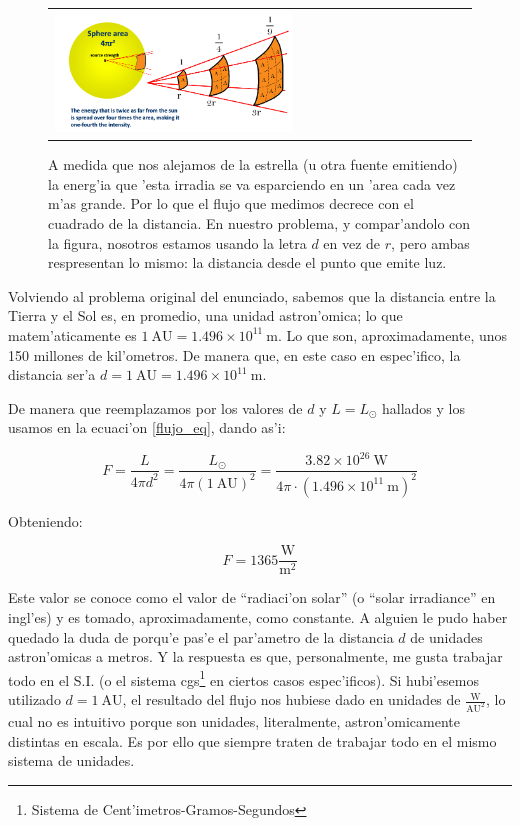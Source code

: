 \documentclass{article}
\begin{document}
\begin{enumerate}[a)]
\begin{figure}[!ht]
\begin{center}
\begin{tabular}{ll}
  \includegraphics[width=0.6\textwidth]{solar.png} 
\end{tabular}
\caption{{\small A medida que nos alejamos de la estrella (u otra fuente emitiendo) la energ'ia que 'esta irradia se va esparciendo en un 'area cada vez m'as grande. Por lo que el flujo que medimos decrece con el cuadrado de la distancia. En nuestro problema, y compar'andolo con la figura, nosotros estamos usando la letra $d$ en vez de $r$, pero ambas respresentan lo mismo: la distancia desde el punto que emite luz.}}\label{fujo_cuadrado}
\end{center} 
\end{figure}


Volviendo al problema original del enunciado, sabemos que la distancia entre la Tierra y el Sol es, en promedio, una unidad astron'omica; lo que matem'aticamente es $1 \ \text{AU} = 1.496 \times 10^{11} \ \text{m}$. Lo que son, aproximadamente, unos 150 millones de kil'ometros. De manera que, en este caso en espec'ifico, la distancia ser'a $d = 1 \ \text{AU} = 1.496 \times 10^{11} \ \text{m}$. 

De manera que reemplazamos por los valores de $d$ y $L = L_\odot$ hallados y los usamos en la ecuaci'on \eqref{flujo_eq}, dando as'i:

\begin{equation*}
F = \frac{L}{4 \pi d^2} = \frac{L_\odot}{4 \pi (1 \ \text{AU})^2} = \frac{3.82 \times 10^{26} \ \text{W}}{4 \pi \cdot (1.496 \times 10^{11} \ \text{m})^2}
\end{equation*}

Obteniendo:

\begin{equation}
F = 1365 \frac{\text{W}}{\text{m}^2}
\end{equation}

Este valor se conoce como el valor de ``radiaci'on solar'' (o ``solar irradiance'' en ingl'es) y es tomado, aproximadamente, como constante. A alguien le pudo haber quedado la duda de porqu'e pas'e el par'ametro de la distancia $d$ de unidades astron'omicas a metros. Y la respuesta es que, personalmente, me gusta trabajar todo en el S.I. (o el sistema cgs\footnote{Sistema de Cent'imetros-Gramos-Segundos} en ciertos casos espec'ificos). Si hubi'esemos utilizado $d = 1 \ \text{AU}$, el resultado del flujo nos hubiese dado en unidades de $\frac{\text{W}}{\text{AU}^2}$, lo cual no es intuitivo porque son unidades, literalmente, astron'omicamente distintas en escala. Es por ello que siempre traten de trabajar todo en el mismo sistema de unidades.


\end{enumerate}
\end{document}
